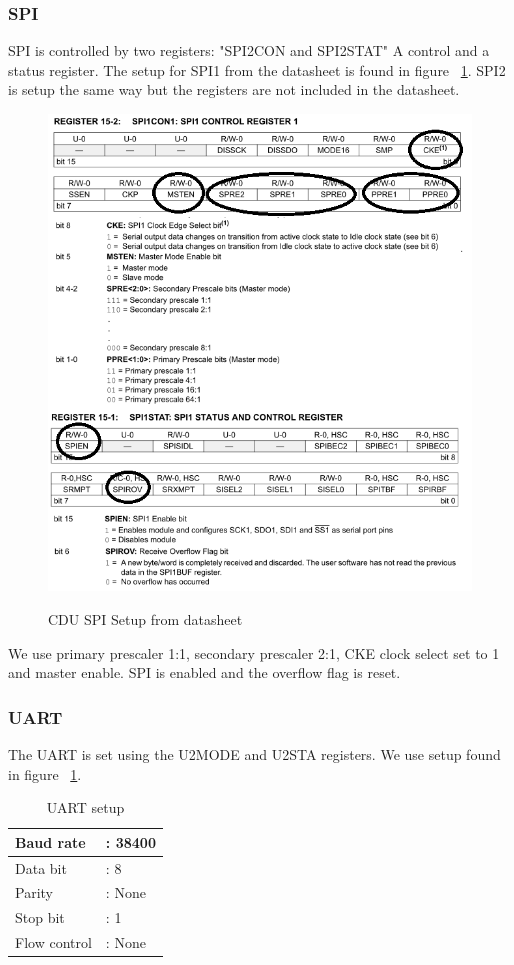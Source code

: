 \subsubsection{SPI}
SPI is controlled by two registers: "SPI2CON and SPI2STAT" A control and a status register. The setup for SPI1 from the datasheet is found in figure ~\ref{fig:spisetup}. SPI2 is setup the same way but the registers are not included in the datasheet.\\
\begin{figure}[H]
\centering
\includegraphics[width=1\textwidth]{billeder/spisetup}
\label{fig:spisetup}
\caption{CDU SPI Setup from datasheet}
\end{figure}
We use primary prescaler 1:1, secondary prescaler 2:1, CKE clock select set to 1 and master enable. SPI is enabled and the overflow flag is reset.
\subsubsection{UART}
The UART is set using the U2MODE and U2STA registers. We use setup found in figure ~\ref{fig:uartsetp}.\\
\begin{table}[H]
	\centering
    \begin{tabular}{|l l|}
    \hline
    Baud rate    & : 38400 \\ \hline
    Data bit     & : 8    \\ \hline
    Parity       & : None \\ \hline
    Stop bit     & : 1    \\ \hline
    Flow control & : None \\ \hline
    \end{tabular}
    \label{fig:uartsetp}
    \caption{UART setup}
\end{table}


